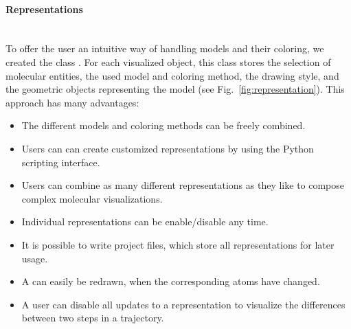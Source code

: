 \paragraph{Representations}
\hspace*{\fill}\\
To offer the user an intuitive way of handling models and their coloring,
we created the class . 
For each visualized object, this class stores the selection of molecular entities, the used 
model and coloring method, the drawing style, and the geometric objects representing the 
model (see Fig.~\ref{fig:representation}).
This approach has many advantages:
\begin{itemize}
  \item The different models and coloring methods can be freely combined.
  \item Users can can create customized representations \eg by using the Python
        scripting interface.
  \item Users can combine as many different representations as they like to
        compose complex molecular visualizations.
  \item Individual representations can be enable/disable any time.
  \item It is possible to write project files, which store all representations
        for later usage.
  \item A  can easily be redrawn, when the corresponding
        atoms have changed.
  \item A user can disable all updates to a representation \eg to visualize the
        differences between two steps in a trajectory.
\end{itemize}

